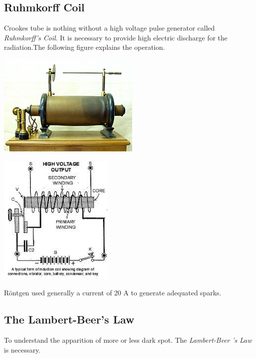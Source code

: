 \documentclass[a4paper,12pt]{report}
\begin{document}
\subsection{Ruhmkorff Coil}
Crookes tube is nothing without a high voltage pulse generator called \textit{Ruhmkorff's Coil}. It is necessary to provide high electric discharge for the radiation.The following figure explains the operation.
\begin{multicols}{2}
  \begin{center}
    \includegraphics[scale=0.6]{ruhmkorff.jpg}
  \end{center}
  \columnbreak
  \begin{center}
    \includegraphics[scale=0.5]{schemRuhm.jpeg}
  \end{center}
\end{multicols}


Röntgen used generally a current of 20 A to generate adequated sparks.


\subsection{The Lambert-Beer's Law}

To understand the apparition of more or less dark spot. The \textit{Lambert-Beer 's Law} is necessary.
\end{document}
